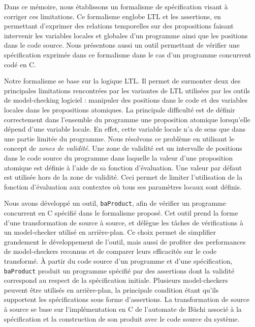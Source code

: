 Dans ce mémoire, nous établissons un formalisme de spécification visant à
corriger ces limitations. Ce formalisme englobe LTL et les assertions, en
permettant d'exprimer des relations temporelles sur des propositions faisant
intervenir les variables locales et globales d'un programme ainsi que les
positions dans le code source. Nous présentons aussi un outil permettant de
vérifier une spécification exprimée dans ce formalisme dans le cas d'un
programme concurrent codé en C.

Notre formalisme se base sur la logique LTL. Il permet de surmonter deux des
principales limitations rencontrées par les variantes de LTL utilisées par les
outils de model-checking logiciel : manipuler des positions dans le code et des
variables locales dans les propositions atomiques. La principale difficulté est
de définir correctement dans l'ensemble du programme une proposition atomique
lorsqu'elle dépend d'une variable locale. En effet, cette variable locale n'a de
sens que dans une partie limitée du programme. Nous résolvons ce problème en
utilisant le concept de \emph{zones de validité}. Une zone de validité est un
intervalle de positions dans le code source du programme dans laquelle la valeur
d'une proposition atomique est définie à l'aide de sa fonction d'évaluation.
Une valeur par défaut est utilisée hors de la zone de validité. Ceci permet de
limiter l'utilisation de la fonction d'évaluation aux contextes où tous ses
paramètres locaux sont définis.

Nous avons développé un outil, \texttt{baProduct}, afin de vérifier un programme
concurrent en C spécifié dans le formalisme proposé. Cet outil prend la forme d'une
transformation de source à source, et délègue les tâches de vérifications à un
model-checker utilisé en arrière-plan. Ce choix permet de simplifier grandement
le développement de l'outil, mais aussi de profiter des performances de
model-checkers reconnus et de comparer leurs efficacités sur le code transformé.
À partir du code source d'un
programme et d'une spécification, \texttt{baProduct} produit un programme
spécifié par des assertions dont la validité correspond au respect de la
spécification initiale. Plusieurs model-checkers peuvent être utilisés en
arrière-plan, la principale condition étant qu'ils supportent les spécifications
sous forme d'assertions. La transformation de source à source se base sur
l'implémentation en C de l'automate de Büchi associé à la spécification et la
construction de son produit avec le code source du système.

